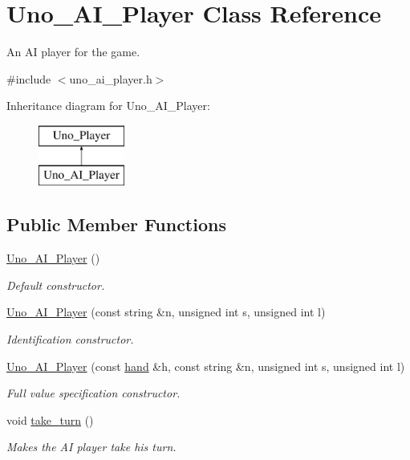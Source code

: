 \hypertarget{class_uno___a_i___player}{
\section{\-Uno\-\_\-\-A\-I\-\_\-\-Player \-Class \-Reference}
\label{class_uno___a_i___player}
}


\-An \-A\-I player for the game.  




{\ttfamily \#include $<$uno\-\_\-ai\-\_\-player.\-h$>$}

\-Inheritance diagram for \-Uno\-\_\-\-A\-I\-\_\-\-Player\-:\begin{figure}[H]
\begin{center}
\leavevmode
\includegraphics[height=2.000000cm]{class_uno___a_i___player}
\end{center}
\end{figure}
\subsection*{\-Public \-Member \-Functions}
\begin{DoxyCompactItemize}
\item 
\hyperlink{class_uno___a_i___player_ae977868f52c315663174b5c4943ac9ef}{\-Uno\-\_\-\-A\-I\-\_\-\-Player} ()
\begin{DoxyCompactList}\small\item\em \-Default constructor. \end{DoxyCompactList}\item 
\hyperlink{class_uno___a_i___player_ab16352005d98a759d298d05afdaaea9e}{\-Uno\-\_\-\-A\-I\-\_\-\-Player} (const string \&n, unsigned int s, unsigned int l)
\begin{DoxyCompactList}\small\item\em \-Identification constructor. \end{DoxyCompactList}\item 
\hyperlink{class_uno___a_i___player_a535884ee15f0d243b43227d941a102c8}{\-Uno\-\_\-\-A\-I\-\_\-\-Player} (const \hyperlink{uno__player_8h_acd9523c15e47a87e3740cf5ade73556e}{hand} \&h, const string \&n, unsigned int s, unsigned int l)
\begin{DoxyCompactList}\small\item\em \-Full value specification constructor. \end{DoxyCompactList}\item 
void \hyperlink{class_uno___a_i___player_a3c67651d11a500c8ebac0f155ac4a6c6}{take\-\_\-turn} ()
\begin{DoxyCompactList}\small\item\em \-Makes the \-A\-I player take his turn. \end{DoxyCompactList}\end{DoxyCompactItemize}
